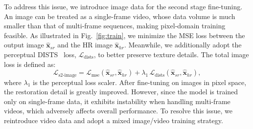 \documentclass{article}
\begin{document}
To address this issue, we introduce image data for the second stage fine-tuning. An image can be treated as a single-frame video, whose data volume is much smaller than that of multi‑frame sequences, making pixel‑domain training feasible. As illustrated in Fig.~\ref{fig:train}, we minimize the MSE loss between the output image $\hat{\mathbf{x}}_{sr}$ and the HR image $\hat{\mathbf{x}}_{hr}$. Meanwhile, we additionally adopt the perceptual DISTS~\cite{ding2020image} loss, $\mathcal{L}_{\text{dists}}$, to better preserve texture details. The total image loss is defined as:
\begin{equation}
\mathcal{L}_{\text{s2-image}} = \mathcal{L}_{\text{mse}}(\hat{\mathbf{x}}_{sr}, \hat{\mathbf{x}}_{hr}) + \lambda_1 \, \mathcal{L}_{\text{dists}}(\hat{\mathbf{x}}_{sr}, \hat{\mathbf{x}}_{hr}),
\end{equation}
where $\lambda_1$ is the perceptual loss scaler. After fine-tuning on images in pixel space, the restoration detail is greatly improved. 
However, since the model is trained only on single-frame data, it exhibits instability when handling multi-frame videos, which adversely affects overall performance. To resolve this issue, we reintroduce video data and adopt a mixed image/video training strategy.
\end{document}
